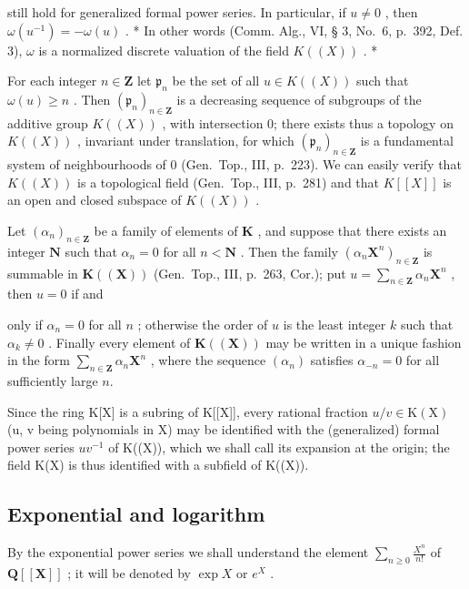 still hold for generalized formal power series. In particular, if \(u \neq 0\) , then \(\omega(u^{-1}) = -\omega(u)\) . * In other words (Comm. Alg., VI, § 3, No.~6, p.~392, Def. 3), \(\omega\) is a normalized discrete valuation of the field \(K((X))\) . *

For each integer \(n \in \mathbf{Z}\) let \(\mathfrak{p}_n\) be the set of all \(u \in K((X))\) such that \(\omega(u) \geqslant n\) . Then \((\mathfrak{p}_n)_{n \in \mathbf{Z}}\) is a decreasing sequence of subgroups of the additive group \(K((X))\) , with intersection 0; there exists thus a topology on \(K((X))\) , invariant under translation, for which \((\mathfrak{p}_n)_{n \in \mathbf{Z}}\) is a fundamental system of neighbourhoods of 0 (Gen.~Top., III, p.~223). We can easily verify that \(K((X))\) is a topological field (Gen.~Top., III, p.~281) and that \(K[[X]]\) is an open and closed subspace of \(K((X))\) .

Let \((\alpha_{n})_{n\in \mathbf{Z}}\) be a family of elements of \(\mathbf{K}\) , and suppose that there exists an integer \(\mathbf{N}\) such that \(\alpha_{n} = 0\) for all \(n < \mathbf{N}\) . Then the family \((\alpha_{n}\mathbf{X}^{n})_{n\in \mathbf{Z}}\) is summable in \(\mathbf{K}((\mathbf{X}))\) (Gen.~Top., III, p.~263, Cor.); put \(u = \sum_{n\in \mathbf{Z}}\alpha_n\mathbf{X}^n\) , then \(u = 0\) if and

only if \(\alpha_{n} = 0\) for all \(n\) ; otherwise the order of \(u\) is the least integer \(k\) such that \(\alpha_{k} \neq 0\) . Finally every element of \(\mathbf{K}((\mathbf{X}))\) may be written in a unique fashion in the form \(\sum_{n \in \mathbf{Z}} \alpha_{n} \mathbf{X}^{n}\) , where the sequence \((\alpha_{n})\) satisfies \(\alpha_{-n} = 0\) for all sufficiently large \(n\).

Since the ring K{[}X{]} is a subring of K{[}{[}X{]}{]}, every rational fraction \(u/v \in \mathrm{K}(\mathrm{X})\) (u, v being polynomials in X) may be identified with the (generalized) formal power series \(uv^{-1}\) of K((X)), which we shall call its expansion at the origin; the field K(X) is thus identified with a subfield of K((X)).

\subsection{Exponential and logarithm}

By the exponential power series we shall understand the element \(\sum_{n\geqslant 0}\frac{X^n}{n!}\) of \(\mathbf{Q}[[\mathbf{X}]]\) ; it will be denoted by \(\exp X\) or \(e^X\) .

